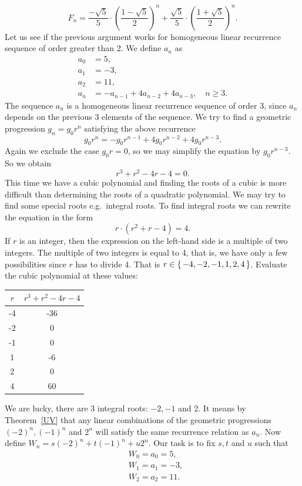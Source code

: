 $$
F_n=\frac{-\sqrt{5}}{5}\cdot \left(\frac{1-\sqrt{5}}{2}\right)^n+\frac{\sqrt{5}}{5}\cdot \left(\frac{1+\sqrt{5}}{2}\right)^n.
$$
Let us see if the previous argument works for homogeneous linear recurrence sequence of order greater than 2.
We define $a_n$ as
\begin{align*}
a_0&=5,\\
a_1&=-3,\\
a_2&=11,\\
a_n&=-a_{n-1}+4a_{n-2}+4a_{n-3},\quad n\geq 3.
\end{align*}
The sequence $a_n$ is a homogeneous linear recurrence sequence of order 3, since $a_n$ depends on 
the previous 3 elements of the sequence. We try to find a geometric progression $g_n=g_0r^n$ satisfying
the above recurrence
$$
g_0r^n=-g_0r^{n-1}+4g_0r^{n-2}+4g_0r^{n-3}.
$$
Again we exclude the case $g_0r=0$, so we may simplify the equation by $g_0r^{n-3}$.
So we obtain
$$
r^3+r^2-4r-4=0.
$$
This time we have a cubic polynomial and finding the roots of a cubic is more difficult than determining
the roots of a quadratic polynomial. We may try to find some special roots e.g.\ integral roots. 
To find integral roots we can rewrite the equation in the form
$$
r\cdot (r^2+r-4)=4.
$$
If $r$ is an integer, then the expression on the left-hand side is a multiple of two integers. The multiple
of two integers is equal to 4, that is, we have only a few possibilities since $r$ has to divide 4. That
is $r\in\left\{\,-4,-2,-1,1,2,4\,\right\}$. Evaluate the cubic polynomial at these values:
\begin{center}
\begin{tabular}{|c|c|}
\hline
$r$ & $r^3+r^2-4r-4$\\
\hline
-4 & -36\\
\hline
-2 & 0\\
\hline
-1 & 0\\
\hline
 1 & -6\\
 \hline
 2 & 0\\
 \hline
 4 & 60\\
 \hline
\end{tabular}
\end{center}
We are lucky, there are 3 integral roots: $-2,-1$ and 2. It means by Theorem~\ref{UV} that any linear combinations
of the geometric progressions $(-2)^n, (-1)^n$ and $2^n$ will satisfy the same recurrence relation as $a_n$.
Now define $W_n=s(-2)^n+t(-1)^n+u2^n$. Our task is to fix $s,t$ and $u$ such that
\begin{align*}
&W_0=a_0=5,\\
&W_1=a_1=-3,\\
&W_2=a_2=11.
\end{align*}
